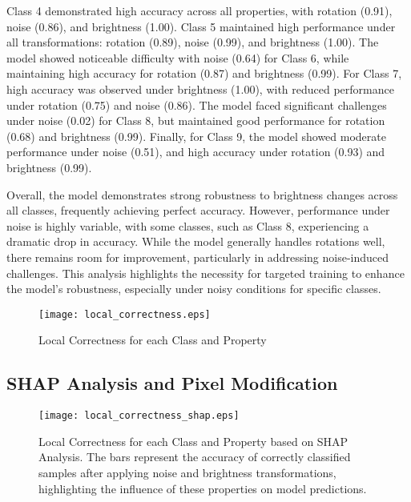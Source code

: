 Class 4 demonstrated high accuracy across all properties, with rotation (0.91), noise (0.86), and brightness (1.00). Class 5 maintained high performance under all transformations: rotation (0.89), noise (0.99), and brightness (1.00). The model showed noticeable difficulty with noise (0.64) for Class 6, while maintaining high accuracy for rotation (0.87) and brightness (0.99). For Class 7, high accuracy was observed under brightness (1.00), with reduced performance under rotation (0.75) and noise (0.86). The model faced significant challenges under noise (0.02) for Class 8, but maintained good performance for rotation (0.68) and brightness (0.99). Finally, for Class 9, the model showed moderate performance under noise (0.51), and high accuracy under rotation (0.93) and brightness (0.99).

Overall, the model demonstrates strong robustness to brightness changes across all classes, frequently achieving perfect accuracy. However, performance under noise is highly variable, with some classes, such as Class 8, experiencing a dramatic drop in accuracy. While the model generally handles rotations well, there remains room for improvement, particularly in addressing noise-induced challenges. This analysis highlights the necessity for targeted training to enhance the model's robustness, especially under noisy conditions for specific classes.

\begin{figure}[h]
    \centering
    \texttt{[image: local\_correctness.eps]}
    \caption{Local Correctness for each Class and Property}
    \label{fig:local_correctness}
\end{figure}
\subsection{SHAP Analysis and Pixel Modification}
\begin{figure}[h]
  \centering
  \texttt{[image: local\_correctness\_shap.eps]}
  \caption{Local Correctness for each Class and Property based on SHAP Analysis. The bars represent the accuracy of correctly classified samples after applying noise and brightness transformations, highlighting the influence of these properties on model predictions.}
  \label{fig:local_correctness_shap}
\end{figure}

